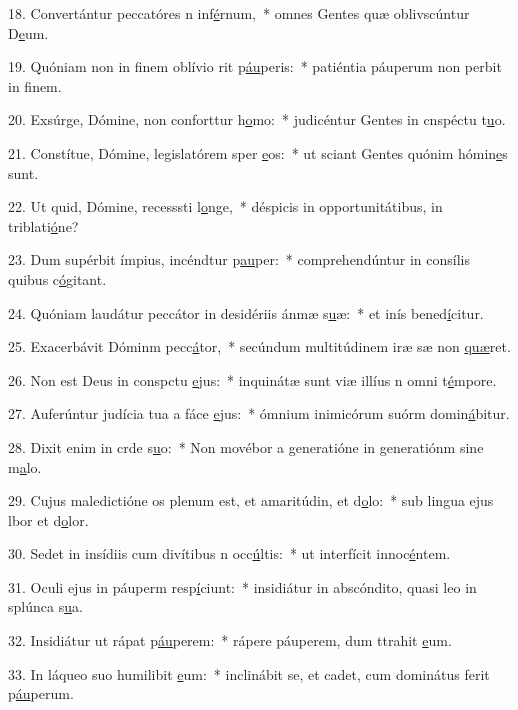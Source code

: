 18. Convertántur peccatóres n inf\uline{é}rnum,~* omnes Gentes quæ oblivscúntur D\uline{e}um.\par 
19. Quóniam non in finem oblívio rit p\uline{áu}peris:~* patiéntia páuperum non perbit in f\uline{i}nem.\par 
20. Exsúrge, Dómine, non conforttur h\uline{o}mo:~* judicéntur Gentes in cnspéctu t\uline{u}o.\par 
21. Constítue, Dómine, legislatórem sper \uline{e}os:~* ut sciant Gentes quónim hómin\uline{e}s sunt.\par 
22. Ut quid, Dómine, recesssti l\uline{o}nge,~* déspicis in opportunitátibus, in triblati\uline{ó}ne?\par 
23. Dum supérbit ímpius, incéndtur p\uline{au}per:~* comprehendúntur in consílis quibus c\uline{ó}gitant.\par 
24. Quóniam laudátur peccátor in desidériis ánmæ s\uline{u}æ:~* et inís bened\uline{í}citur.\par 
25. Exacerbávit Dóminm pecc\uline{á}tor,~* secúndum multitúdinem iræ sæ non \uline{quæ}ret.\par 
26. Non est Deus in conspctu \uline{e}jus:~* inquinátæ sunt viæ illíus n omni t\uline{é}mpore.\par 
27. Auferúntur judícia tua a fáce \uline{e}jus:~* ómnium inimicórum suórm domin\uline{á}bitur.\par 
28. Dixit enim in crde s\uline{u}o:~* Non movébor a generatióne in generatiónm sine m\uline{a}lo.\par 
29. Cujus maledictióne os plenum est, et amaritúdin, et d\uline{o}lo:~* sub lingua ejus lbor et d\uline{o}lor.\par 
30. Sedet in insídiis cum divítibus n occ\uline{ú}ltis:~* ut interfícit innoc\uline{é}ntem.\par 
31. Oculi ejus in páuperm resp\uline{í}ciunt:~* insidiátur in abscóndito, quasi leo in splúnca s\uline{u}a.\par 
32. Insidiátur ut rápat p\uline{áu}perem:~* rápere páuperem, dum ttrahit \uline{e}um.\par 
33. In láqueo suo humilibit \uline{e}um:~* inclinábit se, et cadet, cum dominátus ferit p\uline{áu}perum.\par 
